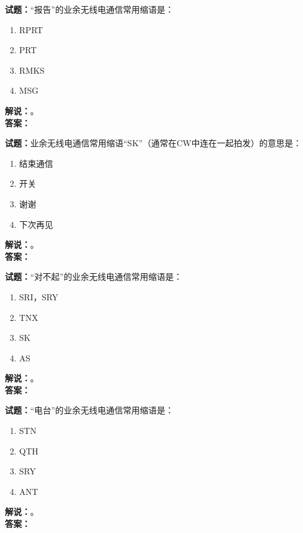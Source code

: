 \documentclass{ctexbook}
\begin{document}
\vspace{\baselineskip}

\noindent\textbf{试题：}“报告”的业余无线电通信常用缩语是：
\begin{enumerate}[leftmargin=3em]
  \item RPRT
  \item PRT
  \item RMKS
  \item MSG
\end{enumerate}
\noindent\textbf{解说：}\textbf{}。\\\noindent\textbf{答案：}

\vspace{\baselineskip}

\noindent\textbf{试题：}业余无线电通信常用缩语“SK”（通常在CW中连在一起拍发）的意思是：
\begin{enumerate}[leftmargin=3em]
  \item 结束通信
  \item 开关
  \item 谢谢
  \item 下次再见
\end{enumerate}
\noindent\textbf{解说：}\textbf{}。\\\noindent\textbf{答案：}

\vspace{\baselineskip}

\noindent\textbf{试题：}“对不起”的业余无线电通信常用缩语是：
\begin{enumerate}[leftmargin=3em]
  \item SRI，SRY
  \item TNX
  \item SK
  \item AS
\end{enumerate}
\noindent\textbf{解说：}\textbf{}。\\\noindent\textbf{答案：}

\vspace{\baselineskip}

\noindent\textbf{试题：}“电台”的业余无线电通信常用缩语是：
\begin{enumerate}[leftmargin=3em]
  \item STN
  \item QTH
  \item SRY
  \item ANT
\end{enumerate}
\noindent\textbf{解说：}\textbf{}。\\\noindent\textbf{答案：}
\end{document}

